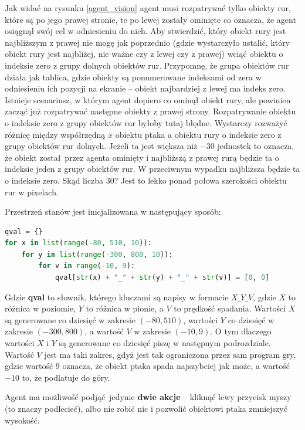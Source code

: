\documentclass[a4paper, 12pt,oneside]{book}
\begin{document}
Jak widać na rysunku \ref{agent_vision} agent musi rozpatrywać tylko obiekty
rur, które są po jego prawej stronie, te po lewej zostały ominięte co oznacza,
że agent osiągnął swój cel w odniesieniu do nich. Aby stwierdzić, który obiekt
rury jest najbliższym z prawej nie mogę jak poprzednio (gdzie wystarczyło
ustalić, który obiekt rury jest najbliżej, nie ważne czy z lewej czy z prawej)
wciąć obiektu o indeksie zero z grupy dolnych obiektów rur. Przypomnę, że grupa
obiektów rur działa jak tablica, gdzie obiekty są ponumerowane indeksami od
zera w odniesieniu ich pozycji na ekranie -- obiekt najbardziej z lewej ma
indeks zero. Istnieje scenariusz, w którym agent dopiero co ominął obiekt rury,
ale powinien zacząć już rozpatrywać następne obiekty z prawej strony.
Rozpatrywanie obiektu o indeksie zero z grupy obiektów rur byłoby tutaj błędne.
Wystarczy rozważyć różnicę między współrzędną $x$ obiektu ptaka a obiektu rury
o indeksie zero z grupy obiektów rur dolnych. Jeżeli ta jest większa niż $-30$
jednostek to oznacza, że obiekt został przez agenta ominięty i najbliższą z
prawej rurą będzie ta o indeksie jeden z grupy obiektów rur. W przeciwnym
wypadku najbliższa będzie ta o indeksie zero. Skąd liczba $30$? Jest to lekko
ponad połowa szerokości obiektu rur w pixelach.

Przestrzeń stanów jest inicjalizowana w następujący sposób:
\begin{lstlisting}[language=Python, label={qval_init}, caption={Inicjalizacja
QValues}]
qval = {}
for x in list(range(-80, 510, 10)):
    for y in list(range(-300, 800, 10)):
        for v in range(-10, 9):
            qval[str(x) + "_" + str(y) + "_" + str(v)] = [0, 0]
\end{lstlisting}
Gdzie \textbf{qval} to słownik, którego kluczami są napisy w formacie
$X\_Y\_V$, gdzie $X$ to różnica w poziomie, $Y$ to różnica w pionie, a $V$ to
prędkość spadania. Wartości $X$ są generowane co dziesięć w zakresie $(-80,
510)$, wartości $Y$ co dziesięć w zakresie $(-300, 800)$, a wartość $V$ w
zakresie $(-10,9)$. O tym dlaczego wartości $X$ i $Y$ są generowane co dziesięć
piszę w następnym podrozdziale. Wartość $V$ jest ma taki zakres, gdyż jest tak
ograniczona przez sam program gry, gdzie wartość $9$ oznacza, że obiekt ptaka
spada najszybciej jak może, a wartość $-10$ to, że podlatuje do góry.

Agent ma możliwość podjąć jedynie \textbf{dwie akcje} -- kliknąć lewy przycisk
myszy (to znaczy podlecieć), albo nie robić nic i pozwolić obiektowi ptaka
zmniejszyć wysokość.
\end{document}
